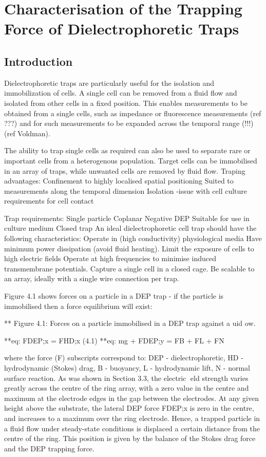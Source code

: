 \chapter{Characterisation of the Trapping Force of Dielectrophoretic Traps} 
\label{Chapter:Trapping_Force}


\section{Introduction}

Dielectrophoretic traps are particularly useful for the isolation and immobilization of cells. A single cell can be removed from a fluid flow and isolated from other cells in a fixed position. This enables measurements to be obtained from a single cells, such as impedance or fluorescence measurements (ref ???) and for such measurements to be expanded across the temporal range (!!!) (ref Voldman).

The ability to trap single cells as required can also be used to separate rare or important cells from a heterogenous population. Target cells can be immobilised in an array of traps, while unwanted cells are removed by fluid flow. Traping advantages: 
Confinement to highly localised spatial positioning 
Suited to measurements along the temporal dimension 
Isolation -issue with cell culture requirements for cell contact

Trap requirements: Single particle Coplanar Negative DEP Suitable for use in culture medium 
Closed trap
An ideal dielectrophoretic cell trap should have the following characteristics: 
Operate in (high conductivity) physiological media
Have minimum power dissipation (avoid fluid heating). 
Limit the exposure of cells to high electric fields 
Operate at high frequencies to minimise induced transmembrane potentials. 
Capture a single cell in a closed cage.
Be scalable to an array, ideally with a single wire connection per trap.

Figure 4.1 shows forces on a particle in a DEP trap - if the particle is immobilised then
a force equilibrium will exist:

** Figure 4.1: Forces on a particle immobilised in a DEP trap against a 
uid 
ow.

**eq: FDEP;x = FHD;x (4.1)
**eq: mg + FDEP;y = FB + FL + FN

where the force (F) subscripts correspond to: DEP - dielectrophoretic, HD - hydrodynamic (Stokes) drag, B - buoyancy, L - hydrodynamic lift, N - normal surface reaction. As was shown in Section 3.3, the electric eld strength varies greatly across the centre of the ring array, with a zero value in the centre and maximum at the electrode edges in the gap between the electrodes. At any given height above the substrate, the lateral DEP force FDEP;x is zero in the centre, and increases to a maximum over the ring electrode. Hence, a trapped particle in a fluid flow under steady-state conditions is displaced a certain distance from the centre of the ring. This position is given by the balance of the Stokes drag force and the DEP trapping force.

